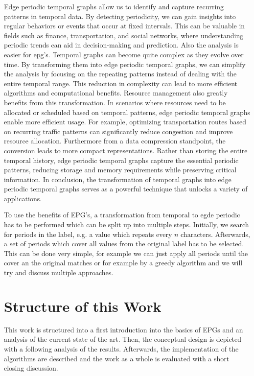 Edge periodic temporal graphs allow us to identify and capture recurring patterns in temporal data. By detecting periodicity, we can gain insights into regular behaviors or events that occur at fixed intervals. This can be valuable in fields such as finance, transportation, and social networks, where understanding periodic trends can aid in decision-making and prediction. Also the analysis is easier for epg's. Temporal graphs can become quite complex as they evolve over time. By transforming them into edge periodic temporal graphs, we can simplify the analysis by focusing on the repeating patterns instead of dealing with the entire temporal range. This reduction in complexity can lead to more efficient algorithms and computational benefits. Resource management also greatly benefits from this transformation. In scenarios where resources need to be allocated or scheduled based on temporal patterns, edge periodic temporal graphs enable more efficient usage. For example, optimizing transportation routes based on recurring traffic patterns can significantly reduce congestion and improve resource allocation. Furthermore from a data compression standpoint, the conversion leads to more compact representations. Rather than storing the entire temporal history, edge periodic temporal graphs capture the essential periodic patterns, reducing storage and memory requirements while preserving critical information. In conclusion, the transformation of temporal graphs into edge periodic temporal graphs serves as a powerful technique that unlocks a variety of applications.

To use the benefits of EPG's, a transformation from temporal to egde periodic has to be performed which can be split up into multiple steps. Initially, we search for periods in the label, e.g. a value which repeats every $n$ characters. Afterwards, a set of periods which cover all values from the original label has to be selected. This can be done very simple, for example we can just apply all periods until the cover an the original matches or for example by a greedy algorithm and we will try and discuss multiple approaches.

\section{Structure of this Work}
\label{ch:Intoduction:sec:Structure}
This work is structured into a first introduction into the basics of EPGs and an analysis of the current state of the art. Then, the conceptual design is depicted with a following analysis of the results. Afterwards, the implementation of the algorithms are described and the work as a whole is evaluated with a short closing discussion.  

